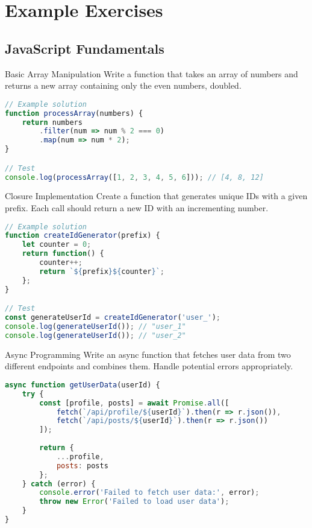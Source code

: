 \section{Example Exercises}

\subsection{JavaScript Fundamentals}

\begin{example2}{Basic Array Manipulation}
Write a function that takes an array of numbers and returns a new array containing only the even numbers, doubled.

\begin{lstlisting}[language=JavaScript, style=basesmol]
// Example solution
function processArray(numbers) {
    return numbers
        .filter(num => num % 2 === 0)
        .map(num => num * 2);
}

// Test
console.log(processArray([1, 2, 3, 4, 5, 6])); // [4, 8, 12]
\end{lstlisting}
\end{example2}

\begin{example2}{Closure Implementation}
Create a function that generates unique IDs with a given prefix. Each call should return a new ID with an incrementing number.

\begin{lstlisting}[language=JavaScript, style=basesmol]
// Example solution
function createIdGenerator(prefix) {
    let counter = 0;
    return function() {
        counter++;
        return `${prefix}${counter}`;
    };
}

// Test
const generateUserId = createIdGenerator('user_');
console.log(generateUserId()); // "user_1"
console.log(generateUserId()); // "user_2"
\end{lstlisting}
\end{example2}

\begin{example2}{Async Programming}
Write an async function that fetches user data from two different endpoints and combines them. Handle potential errors appropriately.

\begin{lstlisting}[language=JavaScript, style=basesmol]
async function getUserData(userId) {
    try {
        const [profile, posts] = await Promise.all([
            fetch(`/api/profile/${userId}`).then(r => r.json()),
            fetch(`/api/posts/${userId}`).then(r => r.json())
        ]);
        
        return {
            ...profile,
            posts: posts
        };
    } catch (error) {
        console.error('Failed to fetch user data:', error);
        throw new Error('Failed to load user data');
    }
}
\end{lstlisting}
\end{example2}


